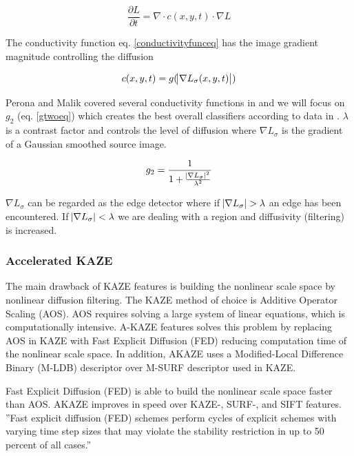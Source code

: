 \documentclass[english,12pt,a4paper,pdftex,elec,utf8]{aaltothesis}
\begin{document}
\begin{equation}
  \label{nonlineareq}
  \frac{\partial L}{\partial t} = \nabla \cdot c(x,y,t)\cdot\nabla L
\end{equation}
\cite{Alcantarilla2012}

The conductivity function eq. \ref{conductivityfunceq} has the image gradient magnitude controlling the diffusion

\begin{equation}
  \label{conductivityfunceq}
c(x,y,t)=g(\abs{\nabla L_\sigma(x,y,t)})
\end{equation}

Perona and Malik covered several conductivity functions in \cite{Perona1990} and we will focus on $g_2$ (eq. \ref{gtwoeq}) which creates the best overall classifiers according to data in \cite{Alcantarilla2012}. $\lambda$ is a contrast factor and controls the level of diffusion where $\nabla L_{\sigma}$ is the gradient of a Gaussian smoothed source image.

\begin{equation}
  \label{gtwoeq}
g_2 = \frac{1}{1 + \frac{\abs{\nabla L_\sigma}^{2}}{\lambda^{2}}}
\end{equation}

$\nabla L_{\sigma}$ can be regarded as the edge detector where if $\abs{\nabla L_{\sigma}} > \lambda$ an edge has been encountered. If $\abs{\nabla L_{\sigma}} < \lambda$ we are dealing with a region and diffusivity (filtering) is increased. \cite{Weickert1998}


\subsubsection{Accelerated KAZE}
The main drawback of KAZE features is building the nonlinear scale space by nonlinear diffusion filtering.  The KAZE method of choice is Additive Operator Scaling (AOS). AOS requires solving a large system of linear equations, which is computationally intensive. A-KAZE features solves this problem by replacing AOS in KAZE with Fast Explicit Diffusion (FED) reducing computation time of the nonlinear scale space. In addition, AKAZE uses a Modified-Local Difference Binary (M-LDB) descriptor over M-SURF descriptor used in KAZE.

Fast Explicit Diffusion (FED) is able to build the nonlinear scale space faster than AOS. AKAZE improves in speed over KAZE-, SURF-, and SIFT features. ''Fast explicit diffusion (FED) schemes perform cycles of explicit schemes with varying time step sizes that may violate the stability restriction in up to 50 percent of all cases.''\cite{Grewenig2010}
\end{document}
